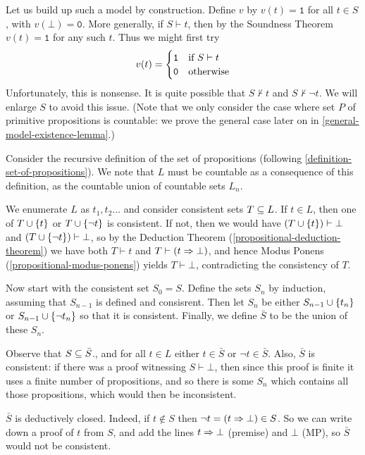 \documentclass{article}
\begin{document}
\begin{prf}
    Let us build up such a model by construction. Define $v$ by $v(t) = \texttt{1}$ for all $t \in S$, with $v(\bot) = \texttt{0}$. More generally, if $S \vdash t$, then by the Soundness Theorem $v(t) = \texttt{1}$ for any such $t$. Thus we might first try
    \[
	v(t) = \begin{cases}
		\texttt{1} & \text{if } S \vdash t \\
		\texttt{0} & \!\mathrel{\, \text{otherwise}}
	\end{cases}
	\]
	Unfortunately, this is nonsense. It is quite possible that $S \not\vdash t$ and $S \not\vdash \lnot t$. We will enlarge $S$ to avoid this issue. (Note that we only consider the case where set $P$ of primitive propositions is countable: we prove the general case later on in \ref{general-model-existence-lemma}.)
	
	Consider the recursive definition of the set of propositions (following \ref{definition-set-of-propositions}). We note that $L$ must be countable as a consequence of this definition, as the countable union of countable sets $L_n$.
	
	We enumerate $L$ as $t_1, t_2 \dots$ and consider consistent sets $T \subseteq L$. If $t \in L$, then one of $T \cup \left\lbrace t \right\rbrace$ or $T \cup \left\lbrace \lnot t \right\rbrace$ is consistent. If not, then we would have $(T \cup \left\lbrace t \right\rbrace) \vdash \bot$ and $(T \cup \left\lbrace \lnot t \right\rbrace) \vdash \bot$, so by the Deduction Theorem (\ref{propositional-deduction-theorem}) we have both $T \vdash t$ and $T \vdash (t \Rightarrow \bot)$, and hence Modus Ponens (\ref{propositional-modus-ponens}) yields $T \vdash \bot$, contradicting the consistency of $T$.
	
	Now start with the consistent set $S_0 = S$. Define the sets $S_n$ by induction, assuming that $S_{n-1}$ is defined and consisrent. Then let $S_n$ be either $S_{n-1} \cup \left\lbrace t_n \right\rbrace$ or $S_{n-1} \cup \left\lbrace \lnot t_n \right\rbrace$ so that it is consistent. Finally, we define $\bar S$ to be the union of these $S_n$.
	
	Observe that $S \subseteq \bar S$., and for all $t \in L$ either $t \in \bar S$ or $\lnot t \in \bar S$. Also, $\bar S$ is consistent: if there was a proof witnessing $S \vdash \bot$, then since this proof is finite it uses a finite number of propositions, and so there is some $S_n$ which contains all those propositions, which would then be inconsistent.
	
	$\bar S$ is deductively closed. Indeed, if $t \notin S$ then $\lnot t = (t \Rightarrow \bot) \in S$. So we can write down a proof of $t$ from $S$, and add the lines $t \Rightarrow \bot$ (premise) and $\bot$ (MP), so $\bar S$ would not be consistent.
	

\end{prf}
\end{document}
